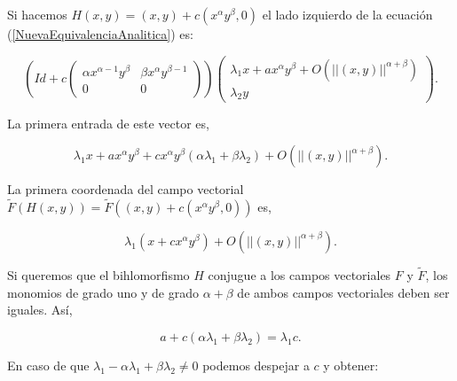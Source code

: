 \noindent Si hacemos $H(x,y)=(x,y)+c(x^{\alpha}y^{\beta},0)$ el lado izquierdo de la ecuación (\ref{NuevaEquivalenciaAnalitica}) es:

\begin{equation*}
(Id+c\begin{pmatrix} \alpha x^{\alpha -1}y^{\beta} & \beta x^{\alpha}y^{\beta -1} \\ 0 & 0 \end{pmatrix})\begin{pmatrix}\lambda_{1}x +ax^{\alpha}y^{\beta}+O(||(x,y)||^{\alpha+\beta})\\ \lambda_{2}y \end{pmatrix}.
\end{equation*} 

\noindent La primera entrada de este vector es,

\begin{equation*}
\lambda_{1}x +ax^{\alpha}y^{\beta}+cx^{\alpha}y^{\beta}(\alpha\lambda_{1} +\beta\lambda_{2}) +O(||(x,y)||^{\alpha+\beta}).
\end{equation*} 

\noindent La primera coordenada del campo vectorial $\tilde{F}(H(x,y))=\tilde{F}((x,y)+c(x^{\alpha}y^{\beta},0))$ es,

\begin{equation*}
\lambda_{1}(x+cx^{\alpha}y^{\beta}) + O(||(x,y)||^{\alpha+\beta}).
\end{equation*}

\noindent Si queremos que el bihlomorfismo $H$ conjugue a los campos vectoriales $F$ y $\tilde{F}$, los monomios de grado uno y de grado $\alpha + \beta$ de ambos campos vectoriales deben ser iguales. Así,

\begin{equation}
a+c(\alpha\lambda_{1}+\beta\lambda_{2})=\lambda_{1}c.
\end{equation}

En caso de que $\lambda_{1}-\alpha\lambda_{1}+\beta\lambda_{2}\neq 0$ podemos despejar a $c$ y obtener:


